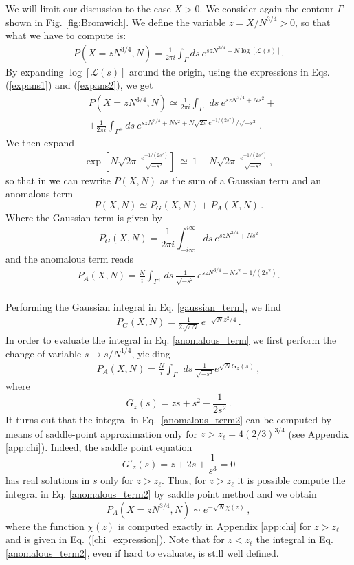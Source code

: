 \documentclass[aps,pre,twocolumn,superscriptaddress,showpacs]{revtex4-1}
\newcommand{\be}{\begin{equation}}
\newcommand{\ee}{\end{equation}}
\newcommand{\bea}{\begin{eqnarray}}
\newcommand{\eea}{\end{eqnarray}}
\newcommand{\mL}{\mathcal{L}}
\begin{document}
We will limit our discussion to the case $X>0$. We consider
  again the contour $\Gamma$ shown in Fig. \ref{fig:Bromwich}. We
  define the variable $z= X/ N^{3/4}>0$, so that what we have to
  compute is:
  \begin{align}
P(X= z N^{3/4},N) = \frac{1}{2\pi i}  \int_{\Gamma} ds~e^{szN^{3/4}+N\log[\mL(s)]}.
\end{align}
By expanding $\log[\mL(s)]$ around the origin, using the expressions in Eqs. (\ref{expans1}) and (\ref{expans2}), we get
  \begin{align}
  & P(X= z N^{3/4},N) \simeq \frac{1}{2\pi i} \int_{\Gamma^-} ds~e^{szN^{3/4} +N s^2} + \nonumber \\
  & + \frac{1}{2\pi i} \int_{\Gamma^+} ds~e^{sz N^{3/4}+N s^2+N \sqrt{2\pi} e^{-1/(2 s^2)}/\sqrt{-s^2}}\,.
    \label{eq:PX_split_1}
  \end{align}
We then expand 
  \begin{align}
 \exp\left[N \sqrt{2\pi}~\frac{e^{-1/(2 s^2)}}{\sqrt{-s^2}} \right]~\simeq~
    1 + N \sqrt{2\pi}~\frac{e^{-1/(2 s^2)}}{\sqrt{-s^2}} \,,
  \end{align}
so that in we can rewrite $P(X,N)$ as the sum of a Gaussian term and an anomalous term
\be
P(X,N) \simeq P_G(X,N) +P_A(X,N)\,.
\label{eq:regime3_3}
\ee
Where the Gaussian term is given by
\be
P_G(X,N)=\frac{1}{2\pi i} \int_{-i\infty}^{i\infty} ds~e^{sz N^{3/4}+N s^2}
\label{gaussian_term}
\ee
and the anomalous term reads
\bea
P_A(X,N)
=\frac{N}{i} \int_{\Gamma^+} ds~\frac{1}{\sqrt{-s^2}}~e^{szN^{3/4}+N s^2-1/(2s^2)}.\nonumber \\ 
\label{anomalous_term}
\eea 

Performing the Gaussian integral in Eq. \eqref{gaussian_term}, we find 
\begin{align}
  P_G(X,N)= \frac{1}{2\sqrt{\pi N}}~e^{-\sqrt{N} z^2/4}\,.
  \label{gaussian_term_2}
\end{align}
In order to evaluate the integral in Eq. \eqref{anomalous_term} we first perform the change of variable $s\to s/N^{1/4}$, yielding
\begin{align}
P_A(X,N)
=\frac{N}{i} \int_{\Gamma^+} ds~\frac{1}{\sqrt{-s^2}} e^{\sqrt{N}G_z(s)}\,,
\label{anomalous_term2}
\end{align}
where
\be G_z(s)=z s+s^2-\frac{1}{2s^2}\,.
\ee
It turns out that the integral in Eq.~\eqref{anomalous_term2} can be computed by means of saddle-point approximation only for $z>z_{\ell}=4(2/3)^{3/4}$
(see Appendix \ref{app:chi}). Indeed, the saddle point equation
\be
G'_z(s)=z+2s+\frac{1}{s^3}=0
\ee
has real solutions in $s$ only for $z>z_{\ell}$.  Thus, for $z>z_{\ell}$ it is possible compute the
integral in Eq. \eqref{anomalous_term2} by saddle point method and we
obtain \be P_A(X=z N^{3/4},N)\sim e^{-\sqrt{N}\chi(z)}\,,
\label{anomalous_term_3}
\ee
where the function $\chi(z)$ is computed exactly in Appendix \ref{app:chi} for $z>z_{\ell}$ and is given in Eq. (\ref{chi_expression}). Note that for $z<z_{\ell}$ the integral in Eq. \eqref{anomalous_term2}, even if hard to evaluate, is still well defined. 
\end{document}
